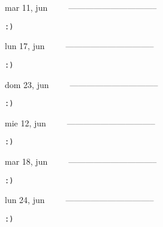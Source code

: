 \documentclass[letterpaper,10pt]{article}
\begin{document}
\begin{multicols}{3}
{mar 11, jun\ \ \ \ \ --------------------------------}
\begin{flushright}\begin{small}\texttt{:)}\end{small}\end{flushright}
\vfill
{lun 17, jun\ \ \ \ \ --------------------------------}
\begin{flushright}\begin{small}\texttt{:)}\end{small}\end{flushright}\par
\vfill
{dom 23, jun\ \ \ \ \ --------------------------------}
\begin{flushright}\begin{small}\texttt{:)}\end{small}\end{flushright}\par
\vfill
\end{multicols}
\vspace{1.05cm}

\begin{multicols}{3}
{mie 12, jun\ \ \ \ \ --------------------------------}
\begin{flushright}\begin{small}\texttt{:)}\end{small}\end{flushright}
\vfill
{mar 18, jun\ \ \ \ \ --------------------------------}
\begin{flushright}\begin{small}\texttt{:)}\end{small}\end{flushright}\par
\vfill
{lun 24, jun\ \ \ \ \ --------------------------------}
\begin{flushright}\begin{small}\texttt{:)}\end{small}\end{flushright}\par
\vfill
\end{multicols}
\vspace{1.05cm}
\end{document}
